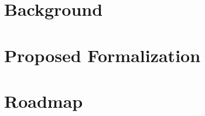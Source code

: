 \documentclass[acmsmall,nonacm]{acmart}
\begin{document}
\section{Background}
\label{sec:background}


\section{Proposed Formalization}
\label{sec:formalization}


\section{Roadmap}
\label{sec:plan}




\balance

\end{document}
